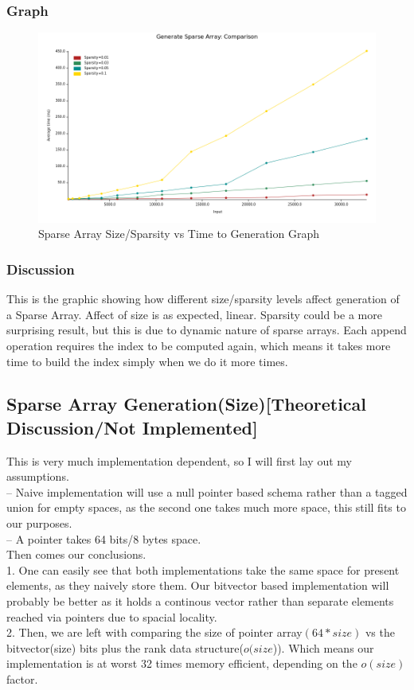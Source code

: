 \documentclass{report}
\begin{document}
\subsubsection*{Graph}
\begin{figure}[h!]
    \centering
    \includegraphics[scale=0.5]{sparse_array_gen_sparsity_vs_size.png}
    \caption{Sparse Array Size/Sparsity vs Time to Generation Graph}
    \label{fig:my_label}
\end{figure}
\subsubsection*{Discussion}
This is the graphic showing how different size/sparsity levels affect generation of a Sparse Array. Affect of size is as expected, linear. Sparsity could be a more surprising result, but this is due to dynamic nature of sparse arrays. Each append operation requires the index to be computed again, which means it takes more time to build the index simply when we do it more times. 
\newpage


\subsection*{Sparse Array Generation(Size)[Theoretical Discussion/Not Implemented]}
This is very much implementation dependent, so I will first lay out my assumptions. \\
-- Naive implementation will use a null pointer based schema rather than a tagged union for empty spaces, as the second one takes much more space, this still fits to our purposes. \\
-- A pointer takes 64 bits/8 bytes space. \\
Then comes our conclusions. \\
1. One can easily see that both implementations take the same space for present elements, as they naively store them. Our bitvector based implementation will probably be better as it holds a continous vector rather than separate elements reached via pointers due to spacial locality. \\
2. Then, we are left with comparing the size of pointer array$(64*size)$ vs the bitvector(size) bits plus the rank data structure($o(size$)). Which means our implementation is at worst 32 times memory efficient, depending on the $o(size)$ factor. \\
\end{document}
